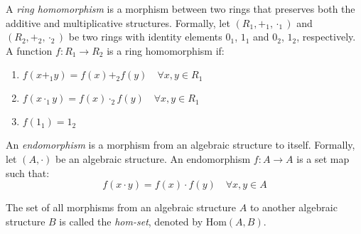 \documentclass[11pt,fleqn]{book} %
\newcommand{\Hom}[2]{\text{Hom}(#1, #2)} %
\begin{document}
\begin{definition}
    A \emph{ring homomorphism} is a morphism between two rings that preserves both the additive and multiplicative structures. Formally, let $(R_1, +_1, \cdot_1)$ and $(R_2, +_2, \cdot_2)$ be two rings with identity elements $0_1$, $1_1$ and $0_2$, $1_2$, respectively. A function $f: R_1 \to R_2$ is a ring homomorphism if:
    \begin{enumerate}
        \item $f(x +_1 y) = f(x) +_2 f(y) \quad \forall x, y \in R_1$
        \item $f(x \cdot_1 y) = f(x) \cdot_2 f(y) \quad \forall x, y \in R_1$
        \item $f(1_1) = 1_2$
    \end{enumerate}    
\end{definition}

\begin{definition}[Endomorphism]
    An \emph{endomorphism} is a morphism from an algebraic structure to itself. Formally, let $(A, \cdot)$ be an algebraic structure. An endomorphism $f: A \to A$ is a set map such that:
    \[
        f(x \cdot y) = f(x) \cdot f(y) \quad \forall x, y \in A
    \]
\end{definition}

\begin{definition}
    The set of all morphisms from an algebraic structure $A$ to another algebraic structure $B$ is called the \emph{hom-set}, denoted by $\Hom{A}{B}$. 
\end{definition}
\end{document}
